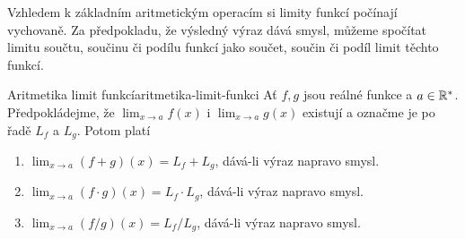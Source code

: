 Vzhledem k základním aritmetickým operacím si limity funkcí počínají vychovaně.
Za předpokladu, že výsledný výraz dává smysl, můžeme spočítat limitu součtu,
součinu či podílu funkcí jako součet, součin či podíl limit těchto funkcí.

\begin{theorem}{Aritmetika limit funkcí}{aritmetika-limit-funkci}
 Ať $f,g$ jsou reálné funkce a $a \in \mathbb{R}^{*}$. Předpokládejme, že $\lim_{x \to
 a} f(x)$ i $\lim_{x \to a} g(x)$ existují a označme je po řadě $L_f$ a $L_g$.
 Potom platí
 \begin{enumerate}[label=(\alph*)]
  \item $\lim_{x \to a} (f + g)(x) = L_f + L_g$, dává-li výraz napravo smysl.
  \item $\lim_{x \to a} (f \cdot g)(x) = L_f \cdot L_g$, dává-li výraz napravo
   smysl.
  \item $\lim_{x \to a} (f / g)(x) = L_f / L_g$, dává-li výraz napravo smysl.
 \end{enumerate}
\end{theorem}

